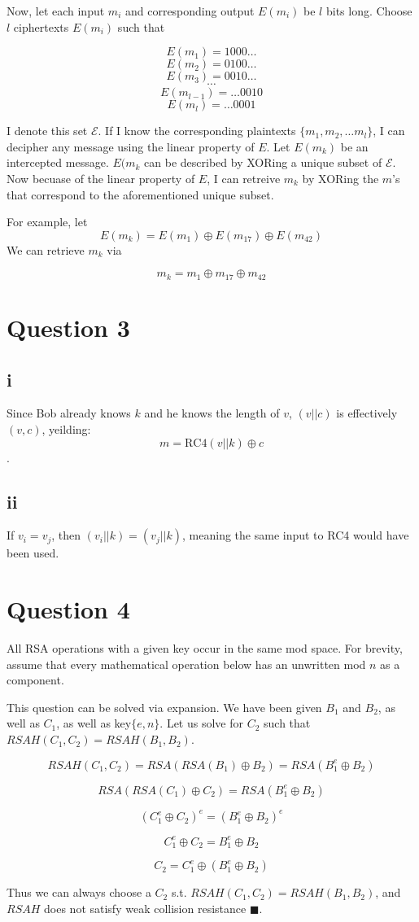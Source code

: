 \documentclass[a4paper,10pt]{article}
\begin{document}
Now, let each input $m_{i}$ and corresponding output $E(m_{i})$ be $l$ bits long.  Choose $l$ ciphertexts $E(m_{i})$ such that

$$E(m_{1}) = 1000\dots$$
$$E(m_{2}) = 0100\dots$$
$$E(m_{3}) = 0010\dots$$
$$\cdots{}$$
$$E(m_{l-1}) = \dots0010$$
$$E(m_{l}) = \dots0001$$

I denote this set $\mathscr{E}$. If I know the corresponding plaintexts $\{m_{1}, m_{2}, \dots m_{l}  \}$, I can decipher any message using the linear property of $E$. Let $E(m_{k})$ be an intercepted message. $E(m_{k}$ can be described by XORing a unique subset of  $\mathscr{E}$.  Now becuase of the linear property of $E$, I can retreive $m_{k}$ by XORing the $m$'s that correspond to the aforementioned unique subset.  

For example, let $$E(m_{k}) = E(m_{1}) \oplus E(m_{17}) \oplus E(m_{42}) $$ 
We can retrieve $m_{k}$ via

$$m_{k} = m_{1} \oplus m_{17} \oplus m_{42} $$



\section{Question 3}
\subsection{i} Since Bob already knows $k$ and he knows the length of $v$, $(v||c)$ is effectively $(v,c)$, yeilding:
$$m = \text{RC4}(v || k) \oplus c$$.
\subsection{ii}
If $v_{i} = v_{j}$, then $(v_{i} || k) =  (v_{j} || k)$, meaning the same input to RC4 would have been used.

\section{Question 4}
All RSA operations with a given key occur in the same mod space.  For brevity, assume that every mathematical operation below has an unwritten mod $n$ as a component. 

This question can be solved via expansion.  We have been given $B_{1}$ and $B_{2}$, as well as $C_{1}$, as well as key$\{e,n\}$.  Let us solve for $C_{2}$ such that $RSAH(C_{1},C_{2}) = RSAH(B_{1},B_{2})$.

$$RSAH(C_{1},C_{2}) = RSA(RSA(B_{1}) \oplus B_{2} ) = RSA( B_{1}^{e} \oplus B_{2} ) $$

$$RSA(RSA(C_{1}) \oplus C_{2} ) =  RSA(B_{1}^{e} \oplus B_{2} )$$

$$(C_{1}^{e} \oplus C_{2} )^{e} =  (B_{1}^{e} \oplus B_{2} )^{e}$$

$$C_{1}^{e} \oplus C_{2} =  B_{1}^{e} \oplus B_{2} $$

$$C_{2} =  C_{1}^{e} \oplus (B_{1}^{e} \oplus B_{2}) $$


Thus we can always choose a $C_{2}$ s.t. $RSAH(C_{1},C_{2}) = RSAH(B_{1},B_{2})$, and $RSAH$ does not satisfy weak collision resistance $\blacksquare$.
\end{document}
